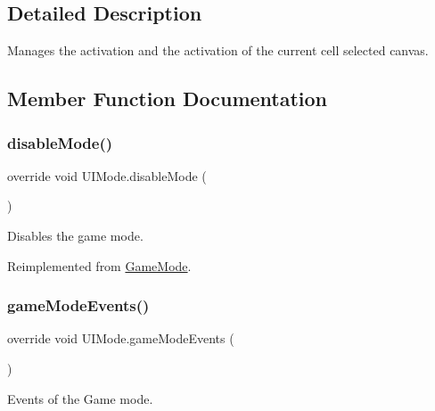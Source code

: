 \subsection{Detailed Description}
Manages the activation and the activation of the current cell selected canvas. 



\subsection{Member Function Documentation}
\mbox{\label{class_u_i_mode_a0dd6193dde5d68b9e1bc94f8a7468db5}} 
\subsubsection{\texorpdfstring{disable\+Mode()}{disableMode()}}
{\footnotesize\ttfamily override void U\+I\+Mode.\+disable\+Mode (\begin{DoxyParamCaption}{ }\end{DoxyParamCaption})\hspace{0.3cm}{\ttfamily [virtual]}}



Disables the game mode. 



Reimplemented from \mbox{\hyperlink{class_game_mode_a5aea49bdae2459b78e1972dd0a34918e}{Game\+Mode}}.

\mbox{\label{class_u_i_mode_a9a0cb075f349e557e8aa8f9f55748c05}} 
\subsubsection{\texorpdfstring{game\+Mode\+Events()}{gameModeEvents()}}
{\footnotesize\ttfamily override void U\+I\+Mode.\+game\+Mode\+Events (\begin{DoxyParamCaption}{ }\end{DoxyParamCaption})\hspace{0.3cm}{\ttfamily [virtual]}}



Events of the Game mode. 



